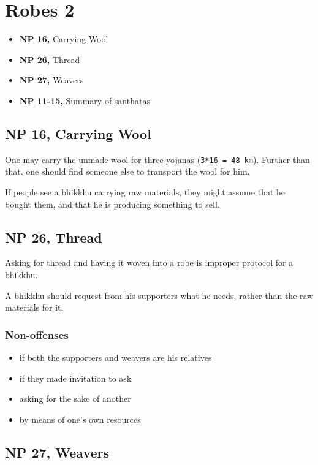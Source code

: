 \chapter{Robes 2}

\begin{itemize}
\tightlist
\item
  \textbf{NP 16,} Carrying Wool
\item
  \textbf{NP 26,} Thread
\item
  \textbf{NP 27,} Weavers
\item
  \textbf{NP 11-15,} Summary of santhatas
\end{itemize}

\section{NP 16, Carrying Wool}

One may carry the unmade wool for three yojanas
(\texttt{3*16\ =\ 48\ km}). Further than that, one should find someone
else to transport the wool for him.

If people see a bhikkhu carrying raw materials, they might assume that
he bought them, and that he is producing something to sell.

\section{NP 26, Thread}

Asking for thread and having it woven into a robe is improper protocol
for a bhikkhu.

A bhikkhu should request from his supporters what he needs, rather than
the raw materials for it.

\subsection{Non-offenses}

\begin{itemize}
\tightlist
\item
  if both the supporters and weavers are his relatives
\item
  if they made invitation to ask
\item
  asking for the sake of another
\item
  by means of one's own resources
\end{itemize}

\section{NP 27, Weavers}

